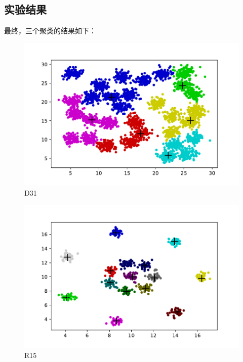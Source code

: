 \documentclass[UTF8,a4paper,AutoFakeBold,AutoFakeSlant]{article}
\begin{document}
\subsection{实验结果}

最终，三个聚类的结果如下：

\begin{figure}[H]
	\centering
	\includegraphics[scale=0.625]{cluster1.pdf}
	\caption{D31}
	\label{f:D31}
\end{figure}

\begin{figure}[H]
	\centering
	\includegraphics[scale=0.625]{cluster2.pdf}
	\caption{R15}
	\label{f:R15}
\end{figure}
\end{document}
